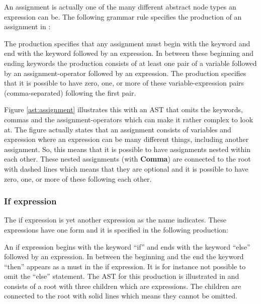 An assignment is actually one of the many different abstract node types an expression can be. The following grammar rule specifies the production of an assignment in \productname{}:%

\begin{ebnf}%
\end{ebnf}%

The production specifies that any assignment must begin with the keyword  and end with the keyword  followed by an expression. In between these beginning and ending keywords the production consists of at least one pair of a variable followed by an assignment-operator followed by an expression. The production specifies that it is possible to have zero, one, or more of these variable-expression pairs (comma-separated) following the first pair.%

%

Figure \ref{ast:assignment} illustrates this with an AST that omits the keywords, commas and the assignment-operators which can make it rather complex to look at. The figure actually states that an assignment consists of variables and expression where an expression can be many different things, including another assignment. So, this means that it is possible to have assignments nested within each other. These nested assignments (with \textbf{Comma}) are connected to the root with dashed lines which means that they are optional and it is possible to have zero, one, or more of these following each other.%

\subsubsection{If expression}%

The if expression is yet another expression as the name indicates. These expressions have one form and it is specified in the following production:%

\begin{ebnf}%
%
\end{ebnf}%

An if expression begins with the keyword ``if'' and ends with the keyword ``else'' followed by an expression. In between the beginning and the end the keyword ``then'' appears as a must in the if expression. It is for instance not possible to omit the ``else'' statement. The AST for this production is illustrated in  and consists of a root with three children which are expressions. The children are connected to the root with solid lines which means they cannot be omitted.%


